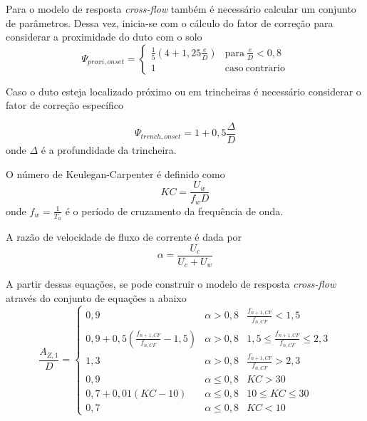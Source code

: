 Para o modelo de resposta \textit{cross-flow} também  é necessário calcular um conjunto de parâmetros. Dessa vez, inicia-se com o cálculo do fator de correção para considerar a proximidade do duto com o solo
\begin{equation}
\label{eq:viv-Psi}
\Psi_{\mathit{proxi}, \mathit{onset}} =
\begin{cases}
\frac{1}{5}\left(4 + 1,25\frac{e}{D} \right) & \mathrm{para}~\frac{e}{D} < 0,8\\
1                                            & \mathrm{caso~contr\acute{a}rio}
\end{cases}
\end{equation}

Caso o duto esteja localizado próximo ou em trincheiras é necessário considerar o fator de correção específico

\begin{equation}
\label{eq:viv-Psitren}
\Psi_{\mathit{trench}, \mathit{onset}} = 1 + 0,5\frac{\Delta}{D}
\end{equation}
onde $\Delta$ é a profundidade da trincheira.

O número de Keulegan-Carpenter é definido como
\begin{equation}
\label{eq:viv-KC}
\mathit{KC} = \frac{U_w}{f_w D}
\end{equation}
onde $f_w = \frac{1}{T_u}$ é o período de cruzamento da frequência de onda.

A razão de velocidade de fluxo de corrente é dada por
\begin{equation}
\label{eq:viv-alfa}
\alpha = \frac{U_c}{U_c + U_w}
\end{equation}

A partir dessas equações, se pode construir o modelo de resposta \textit{cross-flow} através do conjunto de equações a abaixo
\begin{equation}
\label{eq:viv-azdj}
\frac{A_{Z,1}}{D} =
\left\{
\begin{array}{ccc}
0,9                                                      & \alpha > 0,8   &         \frac{f_{n+1,CF}}{f_{n,CF}} <   1,5 \\
0,9 + 0,5 \left(\frac{f_{n+1,CF}}{f_{n,CF}} - 1,5\right) & \alpha > 0,8   & 1,5 \le \frac{f_{n+1,CF}}{f_{n,CF}} \le 2,3 \\
1,3                                                      & \alpha > 0,8   &         \frac{f_{n+1,CF}}{f_{n,CF}} >   2,3 \\
0,9                                                      & \alpha \le 0,8 &        \mathit{KC} >   30 \\
0,7 + 0,01 (\mathit{KC} -10)                             & \alpha \le 0,8 & 10 \le \mathit{KC} \le 30 \\
0,7                                                      & \alpha \le 0,8 &        \mathit{KC} <   10
\end{array}
\right.
\end{equation}

